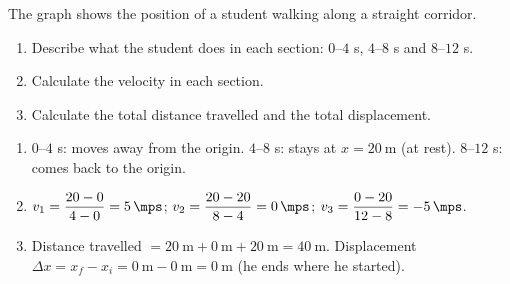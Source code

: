 \begin{exercise}
    The graph shows the position of a student walking along a straight corridor.
    \begin{center}
    \end{center}
    \begin{enumerate}[label=\letraminuscula]
        \item Describe what the student does in each section: \(0\)--\(4\) s, \(4\)--\(8\) s and \(8\)--\(12\) s.
        \item Calculate the velocity in each section.
        \item Calculate the total distance travelled and the total displacement.
    \end{enumerate}
    \begin{solu}
        \begin{enumerate}[label=\alph*)]
            \item \(0\)--\(4\) s: moves away from the origin. \(4\)--\(8\) s: stays at \(x = \qty{20}{\m}\) (at rest). \(8\)--\(12\) s: comes back to the origin.
            \item \(v_1 = \dfrac{20 - 0}{4 - 0} = \qty{5}{\mps}\); \quad \(v_2 = \dfrac{20 - 20}{8 - 4} = \qty{0}{\mps}\); \quad \(v_3 = \dfrac{0 - 20}{12 - 8} = \qty{-5}{\mps}\).
            \item Distance travelled \(= \qty{20}{\m} + \qty{0}{\m} + \qty{20}{\m} = \qty{40}{\m}\). Displacement \(\Delta x = x_f - x_i = \qty{0}{\m} - \qty{0}{\m} = \qty{0}{\m}\) (he ends where he started).
        \end{enumerate}
    \end{solu}
\end{exercise}

